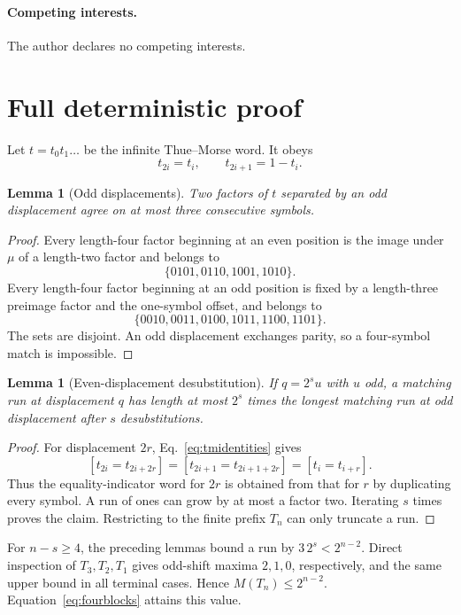 \documentclass[a4paper,twocolumn,11pt,unpublished]{quantumarticle}
\newtheorem{lemma}[theorem]{Lemma}
\begin{document}
\paragraph{Competing interests.}
The author declares no competing interests.

\appendix

\section{Full deterministic proof}
\label{app:proof}

Let $t=t_0t_1\ldots$ be the infinite Thue--Morse word.  It obeys
\begin{equation}
  t_{2i}=t_i,\qquad t_{2i+1}=1-t_i.
  \label{eq:tmidentities}
\end{equation}

\begin{lemma}[Odd displacements]
Two factors of $t$ separated by an odd displacement agree on at most three
consecutive symbols.
\end{lemma}
\begin{proof}
Every length-four factor beginning at an even position is the image under
$\mu$ of a length-two factor and belongs to
\[
\{0101,0110,1001,1010\}.
\]
Every length-four factor beginning at an odd position is fixed by a
length-three preimage factor and the one-symbol offset, and belongs to
\[
\{0010,0011,0100,1011,1100,1101\}.
\]
The sets are disjoint.  An odd displacement exchanges parity, so a
four-symbol match is impossible.
\end{proof}

\begin{lemma}[Even-displacement desubstitution]
If $q=2^s u$ with $u$ odd, a matching run at displacement $q$ has length at
most $2^s$ times the longest matching run at odd displacement after $s$
desubstitutions.
\end{lemma}
\begin{proof}
For displacement $2r$, Eq.~\eqref{eq:tmidentities} gives
\[
[t_{2i}=t_{2i+2r}]
=[t_{2i+1}=t_{2i+1+2r}]
=[t_i=t_{i+r}].
\]
Thus the equality-indicator word for $2r$ is obtained from that for $r$ by
duplicating every symbol.  A run of ones can grow by at most a factor two.
Iterating $s$ times proves the claim.  Restricting to the finite prefix
$T_n$ can only truncate a run.
\end{proof}

For $n-s\geq4$, the preceding lemmas bound a run by
$3\,2^s<2^{n-2}$.  Direct inspection of $T_3,T_2,T_1$ gives odd-shift
maxima $2,1,0$, respectively, and the same upper bound in all terminal
cases.  Hence $M(T_n)\leq2^{n-2}$.  Equation~\eqref{eq:fourblocks} attains
this value.
\end{document}
